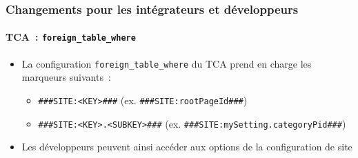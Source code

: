 %

\begin{frame}[fragile]
	\frametitle{Changements pour les intégrateurs et développeurs}
	\framesubtitle{TCA~: \texttt{foreign\_table\_where}}


	\begin{itemize}
		\item La configuration \texttt{foreign\_table\_where} du TCA prend
			en charge les marqueurs suivants~:

			\begin{itemize}
				\item \texttt{\#\#\#SITE:<KEY>\#\#\#}\newline
					(ex. \texttt{\#\#\#SITE:rootPageId\#\#\#})
				\item \texttt{\#\#\#SITE:<KEY>.<SUBKEY>\#\#\#}\newline
					(ex. \texttt{\#\#\#SITE:mySetting.categoryPid\#\#\#})
			\end{itemize}

		\item Les développeurs peuvent ainsi accéder aux options de la configuration de site

	\end{itemize}
\end{frame}

